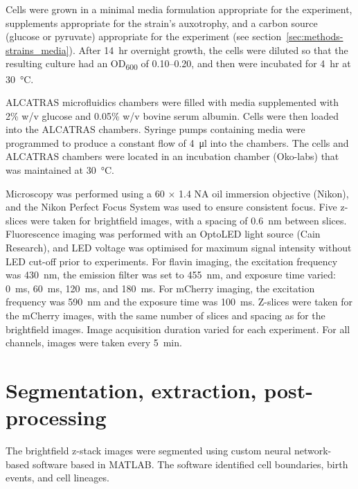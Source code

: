 Cells were grown in a minimal media formulation appropriate for the experiment, supplements appropriate for the strain's auxotrophy, and a carbon source (glucose or pyruvate) appropriate for the experiment (see section~\ref{sec:methods-strains_media}).
After \SI{14}{hr} overnight growth, the cells were diluted so that the resulting culture had an OD\textsubscript{600} of 0.10--0.20, and then were incubated for \SI{4}{hr} at \SI{30}{\celsius}.

ALCATRAS microfluidics \parencite{craneMicrofluidicSystemStudying2014}  chambers were filled with media supplemented with 2\% w/v glucose and 0.05\% w/v bovine serum albumin.
Cells were then loaded into the ALCATRAS chambers.
Syringe pumps containing media were programmed to produce a constant flow of \SI{4}{\micro\litre} into the chambers.
The cells and ALCATRAS chambers were located in an incubation chamber (Oko-labs) that was maintained at \SI{30}{\celsius}.

Microscopy was performed using a 60 $\times$ 1.4 NA oil immersion objective (Nikon), and the Nikon Perfect Focus System was used to ensure consistent focus.
Five z-slices were taken for brightfield images, with a spacing of \SI{0.6}{\nano\metre} between slices.
Fluorescence imaging was performed with an OptoLED light source (Cain Research), and LED voltage was optimised for maximum signal intensity without LED cut-off prior to experiments.
For flavin imaging, the excitation frequency was \SI{430}{\nano\metre}, the emission filter was set to \SI{455}{\nano\metre}, and exposure time varied: \SI{0}{\milli\second}, \SI{60}{\milli\second}, \SI{120}{\milli\second}, and \SI{180}{\milli\second}.
For mCherry imaging, the excitation frequency was \SI{590}{\nano\metre} and the exposure time was \SI{100}{\milli\second}.
Z-slices were taken for the mCherry images, with the same number of slices and spacing as for the brightfield images.
Image acquisition duration varied for each experiment.
For all channels, images were taken every \SI{5}{min}.

\section{Segmentation, extraction, post-processing}
\label{sec:methods-segmentation}


The brightfield z-stack images were segmented using custom neural network-based software based in MATLAB.
The software identified cell boundaries, birth events, and cell lineages.

